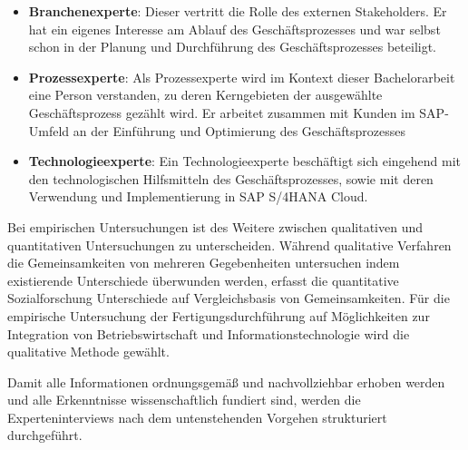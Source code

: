 \begin{itemize}
    \item 
    \textbf{Branchenexperte}: Dieser vertritt die Rolle des externen Stakeholders. Er hat ein eigenes Interesse am Ablauf des Geschäftsprozesses und war selbst schon in der Planung und Durchführung des Geschäftsprozesses beteiligt. 
    \item
    \textbf{Prozessexperte}: Als Prozessexperte wird im Kontext dieser Bachelorarbeit eine Person verstanden, zu deren Kerngebieten der ausgewählte Geschäftsprozess gezählt wird. Er arbeitet zusammen mit Kunden im SAP-Umfeld an der Einführung und Optimierung des Geschäftsprozesses
    \item
    \textbf{Technologieexperte}:  Ein Technologieexperte beschäftigt sich eingehend mit den technologischen Hilfsmitteln des Geschäftsprozesses, sowie mit deren Verwendung und Implementierung in SAP S/4HANA Cloud.
\end{itemize}

Bei empirischen Untersuchungen ist des Weitere  zwischen qualitativen und quantitativen Untersuchungen zu unterscheiden. Während qualitative Verfahren die Gemeinsamkeiten von mehreren Gegebenheiten untersuchen indem existierende Unterschiede überwunden werden, erfasst die quantitative Sozialforschung Unterschiede auf Vergleichsbasis von Gemeinsamkeiten. Für die empirische Untersuchung der Fertigungsdurchführung auf Möglichkeiten zur Integration von Betriebswirtschaft und Informationstechnologie wird die qualitative Methode gewählt. 

Damit alle Informationen ordnungsgemäß und nachvollziehbar erhoben werden und alle Erkenntnisse wissenschaftlich fundiert sind, werden die Experteninterviews nach dem untenstehenden Vorgehen strukturiert durchgeführt.


